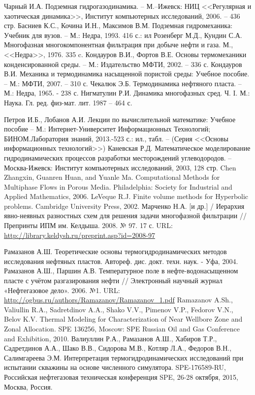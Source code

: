 \begin{thebibliography}{99}

 Чарный И.А. Подземная гидрогазодинамика. -- М.--Ижевск: НИЦ <<Регулярная и хаотическая динамика>>, Институт компьютерных исследований, 2006. -- 436 стр.
 Басниев К.С., Кочина И.Н., Максимов В.М. Подземная гидромеханика: Учебник для вузов. -- М.: Недра, 1993. 416 с.: ил
 Розенберг М.Д., Кундин С.А. Многофазная многокомпонентная фильтрация при добыче нефти и газа. М., <<Недра>>, 1976. 335 c.
 Кондауров В.И., Фортов В.Е. Основы термомеханики конденсированной среды. -- М.: Издательство МФТИ, 2002. -- 336 с.
 Кондауров В.И. Механика и термодинамика насыщенной пористой среды: Учебное пособие. -- М.: МФТИ, 2007. -- 310 с.
 Чекалюк Э.Б. Термодинамика нефтяного пласта. -- М.: Недра, 1965. - 238 с.
 Нигматулин Р.И. Динамика многофазных сред. Ч. I. М.: Наука. Гл. ред. физ-мат. лит. 1987 -- 464 с.

 Петров И.Б., Лобанов А.И. Лекции по вычислительной математике: Учебное пособие -- М.: Интернет-Университет Информационных Технологий; БИНОМ.Лаборатория знаний, 2013.-523 с.: ил., табл. -- (Серия <<Основы информационных технологий>>)
 Каневская Р.Д. Математическое моделирование гидродинамических процессов разработки месторождений углеводородов. -- Москва-Ижевск: Институт компьютерных исследований, 2003, 128 стр.
 Chen Zhangxin, Guanren Huan, and Yuanle Ma. Computational Methods for Multiphase Flows in Porous Media. Philadelphia: Society for Industrial and Applied Mathematics, 2006.
 LeVeque R.J. Finite volume methods for Hyperbolic problems. Cambridge University Press, 2002.
 Марченко Н.А. [и др.] / Иерархия явно-неявных разностных схем для решения задачи многофазной фильтрации // Препринты ИПМ им. Келдыша. 2008. № 97. 17 с. URL: \url{http://library.keldysh.ru/preprint.asp?id=2008-97}

 Рамазанов А.Ш. Теоретические основы термогидродинамических методов исследования нефтяных пластов. Автореф. дис. докт. техн. наук. - Уфа, 2004.
 Рамазанов А.Ш., Паршин А.В. Температурное поле в нефте-водонасыщенном пласте с учётом разгазирования нефти // Электронный научный журнал «Нефтегазовое дело». 2006. №1. URL: \url{http://ogbus.ru/authors/Ramazanov/Ramazanov_1.pdf}
 Ramazanov A.Sh., Valiullin R.A., Sadretdinov A.A., Shako V.V., Pimenov V.P., Fedorov V.N., Belov K.V. Thermal Modeling for Characterization of Near Wellbore Zone and Zonal Allocation. SPE 136256, Moscow: SPE Russian Oil and Gas Conference and Exhibition, 2010.
 Валиуллин Р.А., Рамазанов А.Ш., Хабиров Т.Р., Садретдинов А.А., Шако В.В., Сидорова М.В., Котляр Л.А., Федоров В.Н., Салимгареева Э.М. Интерпретация термогидродинамических  исследований при испытании скважины на основе численного симулятора. SPE-176589-RU, Российская нефтегазовая техническая конференция SPE, 26-28 октября, 2015, Москва, Россия.


\end{thebibliography}
